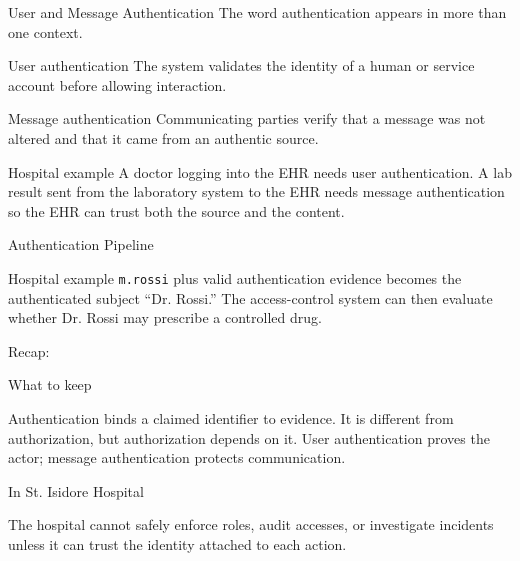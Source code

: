 \documentclass[presentation]{beamer}
\newcommand{\scenario}{St. Isidore Hospital}
\newcommand{\takeawaysframe}[2]{
  \begin{frame}[c]{Recap: \insertsection}
    \begin{block}{What to keep}
      #1
    \end{block}
    \begin{exampleblock}{In \scenario}
      #2
    \end{exampleblock}
  \end{frame}
}
\begin{document}
\begin{frame}[c]{User and Message Authentication}
  The word authentication appears in more than one context.

  \begin{block}{User authentication}
    The system validates the identity of a human or service account before allowing interaction.
  \end{block}

  \begin{block}{Message authentication}
    Communicating parties verify that a message was not altered and that it came from an authentic source.
  \end{block}

  \begin{exampleblock}{Hospital example}
    A doctor logging into the EHR needs user authentication. A lab result sent from the laboratory system to the EHR needs message authentication so the EHR can trust both the source and the content.
  \end{exampleblock}
\end{frame}

\begin{frame}[c]{Authentication Pipeline}
  \begin{center}
  \end{center}

  \vspace{0.5cm}
  \begin{exampleblock}{Hospital example}
    \texttt{m.rossi} plus valid authentication evidence becomes the authenticated subject ``Dr. Rossi.'' The access-control system can then evaluate whether Dr. Rossi may prescribe a controlled drug.
  \end{exampleblock}
\end{frame}

\takeawaysframe{
  Authentication binds a claimed identifier to evidence. It is different from authorization, but authorization depends on it. User authentication proves the actor; message authentication protects communication.
}{
  The hospital cannot safely enforce roles, audit accesses, or investigate incidents unless it can trust the identity attached to each action.
}
\end{document}
